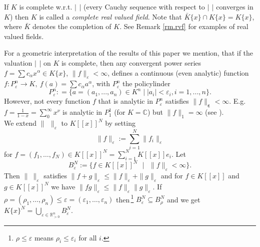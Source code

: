 \documentclass[11pt]{article}
\newcommand{\R}{{\mathbb R}}
\newcommand{\C}{{\mathbb C}}
\newcommand{\beps}{\boldsymbol{\varepsilon}}
\newcommand{\eps}{\varepsilon}
\begin{document}
 If  $K$  is complete w.r.t. $| \,\ |$ (every Cauchy sequence with respect to $| \,\ |$ converges in $K$) then $K$ is called a {\em complete real valued field}.
Note that $\bar K\{x\}\cap K\{x\}=K\{x\}$, where $\bar K$ denotes the completion of $K$. See Remark \ref{rm.rvf} for examples of real valued fields.

For a geometric interpretation of the results of this paper we mention, that if the valuation $| \,\ |$ on $K$ is  complete, then any convergent power series 
 $f= \sum c_\alpha x^\alpha \in K\{x\}$, $\|f\|_{\eps}< \infty$, defines a continuous (even analytic) function $f: P^n_\eps \to K, \ f(a) = \sum c_\alpha a^\alpha$, with $P^n_\eps$ the policylinder
 $$P^n_\eps: =
\{a=(a_1,...,a_n) \in K^n \mid |a_i| < \eps_i, i =1,...,n\}.$$
 {However, not every function $f$ that is analytic in $P^n_\eps$ satisfies $\|f\|_{\beps}< \infty$. E.g.  $f = \frac{1}{1-x} = \sum_0^\infty x^\nu$ is analytic in $P^1_1$ (for $K=\C$) but $\|f\|_{1}= \infty$
(see \cite[§1.1, Bemerkung]{GR71}). }\\

We extend $\| \,\ \|_{\eps}$ to $K[[x]]^N$ by setting 
$$\|f\|_{\eps}:= \sum_{i=1}^N\|f_i\|_{\eps}$$
for $f=(f_1,\ldots,f_N)\in K[[x ]]^N=\sum_{i=1}^N K[[x]]e_i$.
Let 
$$B_{\eps}^N:=\{f\in K[[x]]^N \text{  } | \text{ } \|f\|_{\eps}<\infty\}.$$
Then $\| \ \|_{\eps}$ 
satisfies  $ \|f+g\|_{\eps}\le  \|f\|_{\eps}+ \|g\|_{\eps}$ and for 
$f\in K[[x]]$ and $g \in K[[x]]^N$ we have
$ \|fg\|_{\eps}\le  \|f\|_{\eps} \|g\|_{\eps}$.
 If $\rho=(\rho_1,\ldots,\rho_n)\leq\eps=(\eps_1,\ldots,\eps_n)$ then\,\footnote{$\rho\leq\eps$ means $\rho_i\leq\eps_i$ for all $i$.} $B_\eps^N\subseteq B_\rho^N$
and we get
$K\{x\}^N=\bigcup_{\eps\in\R^n_{>0}} B_{\eps}^N$. 
\end{document}
